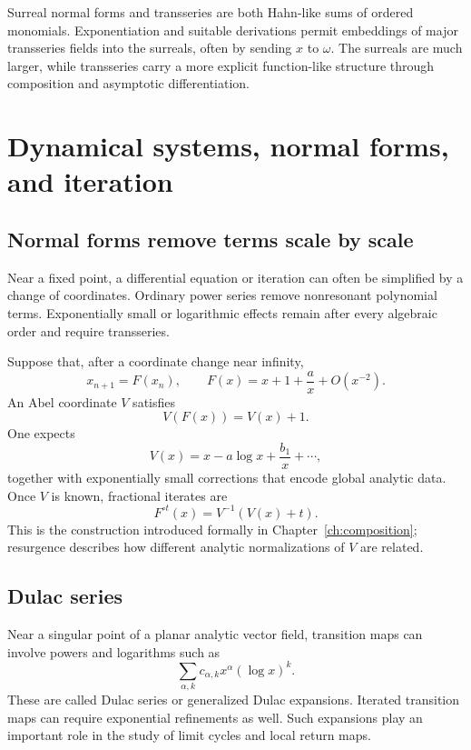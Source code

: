 \documentclass[11pt,oneside]{book}
\theoremstyle{definition}
\theoremstyle{remark}
\newcommand{\bigO}{O}
\newcommand{\compose}{\mathbin{\circ}}
\begin{document}
\begin{summarybox}
Surreal normal forms and transseries are both Hahn-like sums of ordered
monomials. Exponentiation and suitable derivations permit embeddings of major
transseries fields into the surreals, often by sending $x$ to $\omega$. The
surreals are much larger, while transseries carry a more explicit function-like
structure through composition and asymptotic differentiation.
\end{summarybox}


\chapter{Dynamical systems, normal forms, and iteration}
\label{ch:dynamics}

\section{Normal forms remove terms scale by scale}

Near a fixed point, a differential equation or iteration can often be simplified
by a change of coordinates. Ordinary power series remove nonresonant polynomial
terms. Exponentially small or logarithmic effects remain after every algebraic
order and require transseries.

Suppose that, after a coordinate change near infinity,
\[
  x_{n+1}=F(x_n),
  \qquad F(x)=x+1+\frac{a}{x}+\bigO(x^{-2}).
\]
An Abel coordinate $V$ satisfies
\begin{equation}
  V(F(x))=V(x)+1.
  \label{eq:abel-equation-dynamics}
\end{equation}
One expects
\[
  V(x)=x-a\log x+\frac{b_1}{x}+\cdots,
\]
together with exponentially small corrections that encode global analytic
data. Once $V$ is known, fractional iterates are
\[
  F^{\compose t}(x)=V^{-1}(V(x)+t).
\]
This is the construction introduced formally in
Chapter~\ref{ch:composition}; resurgence describes how different analytic
normalizations of $V$ are related.

\section{Dulac series}

Near a singular point of a planar analytic vector field, transition maps can
involve powers and logarithms such as
\begin{equation}
  \sum_{\alpha,k}c_{\alpha,k}x^\alpha(\log x)^k.
  \label{eq:dulac-series}
\end{equation}
These are called Dulac series or generalized Dulac expansions. Iterated
transition maps can require exponential refinements as well. Such expansions
play an important role in the study of limit cycles and local return maps.
\end{document}
